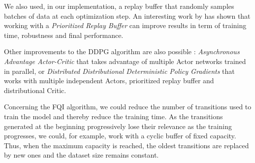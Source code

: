 \documentclass[a4paper, 12pt]{article}
\begin{document}
    We also used, in our implementation, a replay buffer that randomly samples batches of data at each optimization step. An interesting work by \textcite{hou2019improving} has shown that working with a \emph{Prioritized Replay Buffer} can improve results in term of training time, robustness and final performance.
    
    Other improvements to the DDPG algorithm are also possible \cite{mediumddpgimprovements}: \emph{Asynchronous Advantage Actor-Critic} \cite{mnih2016asynchronous} that takes advantage of multiple Actor networks trained in parallel, or \emph{Distributed Distributional Deterministic Policy Gradients} \cite{barth2018distributed} that works with multiple independent Actors, prioritized replay buffer and distributional Critic.
    
    Concerning the FQI algorithm, we could reduce the number of transitions used to train the model and thereby reduce the training time. As the transitions generated at the beginning progressively lose their relevance as the training progresses, we could, for example, work with a cyclic buffer of fixed capacity. Thus, when the maximum capacity is reached, the oldest transitions are replaced by new ones and the dataset size remains constant.

    \newpage

    \printbibliography
\end{document}
